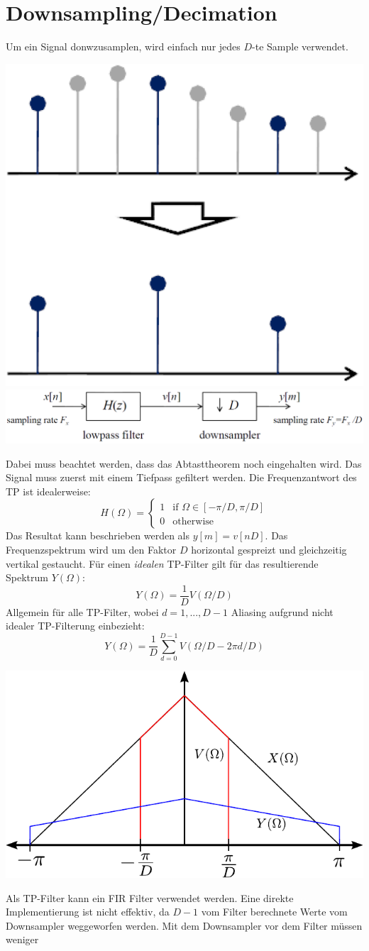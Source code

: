 \section{Downsampling/Decimation}
Um ein Signal donwzusamplen, wird einfach nur jedes $D$-te Sample verwendet.
\begin{center}
	\includegraphics[width=.2\textwidth]{../fig/downsample}
	\includegraphics[width=.6\textwidth]{../fig/decimation}
\end{center}
Dabei muss beachtet werden, dass das Abtasttheorem noch eingehalten wird. Das
Signal muss zuerst mit einem Tiefpass gefiltert werden. Die Frequenzantwort des TP ist
idealerweise:
\[ H(\Omega) = \left\lbrace \begin{matrix}
	1 & \textrm{if } \Omega \in [-\pi/D,\pi/D]\\
	0 & \textrm{otherwise}
\end{matrix} \right. \] 
Das Resultat kann beschrieben werden als $y[m] = v[nD]$. Das Frequenzspektrum
wird um den Faktor $D$ horizontal gespreizt und gleichzeitig vertikal 
gestaucht. Für einen \emph{idealen} TP-Filter gilt für das resultierende Spektrum $Y(\Omega)$:
\[ Y(\Omega) = \frac{1}{D} V(\Omega/D)  \]
Allgemein für alle TP-Filter, wobei $d=1,...,D-1$ Aliasing aufgrund nicht idealer TP-Filterung einbezieht:
\[ Y(\Omega) = \frac{1}{D} \sum_{d=0}^{D-1} V(\Omega/D-2\pi d/D) \]
\begin{center}
	\includegraphics[width=.45\textwidth]{../fig/decimation_frequenz}
\end{center}
Als TP-Filter kann ein FIR Filter verwendet werden. Eine direkte Implementierung
ist nicht effektiv, da $D-1$ vom Filter berechnete Werte vom Downsampler
weggeworfen werden. Mit dem Downsampler vor dem Filter müssen weniger
